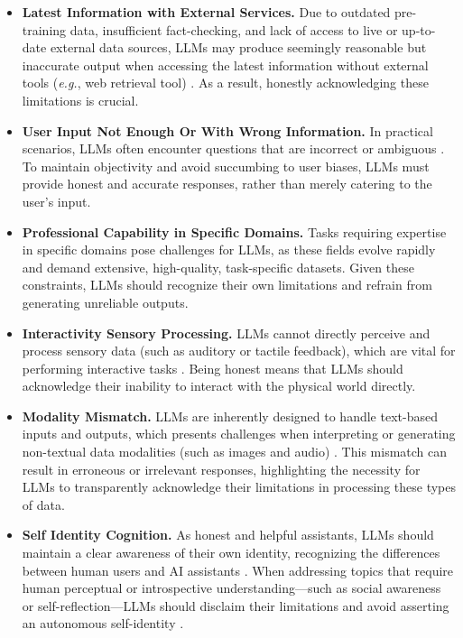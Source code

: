 \begin{itemize}[nolistsep, leftmargin=*]
    \item \textbf{Latest Information with External Services.} Due to outdated pre-training data, insufficient fact-checking, and lack of access to live or up-to-date external data sources, LLMs may produce seemingly reasonable but inaccurate output when accessing the latest information without external tools (\emph{e.g.}, web retrieval tool) \citep{zhuang2024toolqa, lewis2020retrieval}. As a result, honestly acknowledging these limitations is crucial.
    \item \textbf{User Input Not Enough Or With Wrong Information.} In practical scenarios, LLMs often encounter questions that are incorrect or ambiguous \citep{kim2024aligning}. To maintain objectivity and avoid succumbing to user biases, LLMs must provide honest and accurate responses, rather than merely catering to the user's input.
    \item \textbf{Professional Capability in Specific Domains.} Tasks requiring expertise in specific domains pose challenges for LLMs, as these fields evolve rapidly and demand extensive, high-quality, task-specific datasets. Given these constraints, LLMs should recognize their own limitations and refrain from generating unreliable outputs.
    \item \textbf{Interactivity Sensory Processing.} LLMs cannot directly perceive and process sensory data (such as auditory or tactile feedback), which are vital for performing interactive tasks \citep{rissling2013demand}. Being honest means that LLMs should acknowledge their inability to interact with the physical world directly.
    \item \textbf{Modality Mismatch. }LLMs are inherently designed to handle text-based inputs and outputs, which presents challenges when interpreting or generating non-textual data modalities (such as images and audio) \citep{zhang2024mm, peng2023instruction}. This mismatch can result in erroneous or irrelevant responses, highlighting the necessity for LLMs to transparently acknowledge their limitations in processing these types of data. 
    \item \textbf{Self Identity Cognition.} As honest and helpful assistants, LLMs should maintain a clear awareness of their own identity, recognizing the differences between human users and AI assistants \citep{mahowald2024dissociating}. When addressing topics that require human perceptual or introspective understanding—such as social awareness or self-reflection—LLMs should disclaim their limitations and avoid asserting an autonomous self-identity \citep{li2024think, lurz2009philosophy, mahowald2024dissociating, berglund2023taken, huang2024position}.
\end{itemize}


